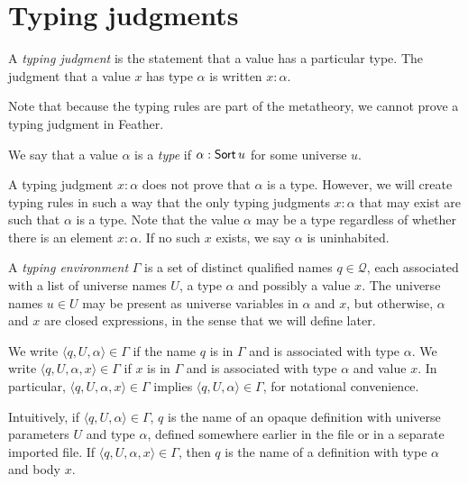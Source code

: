 \section{Typing judgments}
\begin{defn}
	A \textit{typing judgment} is the statement that a value has a particular type.
	The judgment that a value \( x \) has type \( \alpha \) is written \( x : \alpha \).
\end{defn}
Note that because the typing rules are part of the metatheory, we cannot prove a typing judgment in Feather.
\begin{defn}
	We say that a value \( \alpha \) is a \textit{type} if \( \alpha : \operatorname{\mathsf{Sort}} u \) for some universe \( u \).
\end{defn}
A typing judgment \( x : \alpha \) does not prove that \( \alpha \) is a type.
However, we will create typing rules in such a way that the only typing judgments \( x : \alpha \) that may exist are such that \( \alpha \) is a type.
Note that the value \( \alpha \) may be a type regardless of whether there is an element \( x : \alpha \).
If no such \( x \) exists, we say \( \alpha \) is uninhabited.
\begin{defn}
	A \textit{typing environment} \( \Gamma \) is a set of distinct qualified names \( q \in \mathcal Q \), each associated with a list of universe names \( U \), a type \( \alpha \) and possibly a value \( x \).
	The universe names \( u \in U \) may be present as universe variables in \( \alpha \) and \( x \), but otherwise, \( \alpha \) and \( x \) are closed expressions, in the sense that we will define later.

	We write \( \langle q, U, \alpha \rangle \in \Gamma \) if the name \( q \) is in \( \Gamma \) and is associated with type \( \alpha \).
	We write \( \langle q, U, \alpha, x \rangle \in \Gamma \) if \( x \) is in \( \Gamma \) and is associated with type \( \alpha \) and value \( x \).
	In particular, \( \langle q, U, \alpha, x \rangle \in \Gamma \) implies \( \langle q, U, \alpha \rangle \in \Gamma \), for notational convenience.
\end{defn}
Intuitively, if \( \langle q, U, \alpha \rangle \in \Gamma \), \( q \) is the name of an opaque definition with universe parameters \( U \) and type \( \alpha \), defined somewhere earlier in the file or in a separate imported file.
If \( \langle q, U, \alpha, x \rangle \in \Gamma \), then \( q \) is the name of a definition with type \( \alpha \) and body \( x \).

